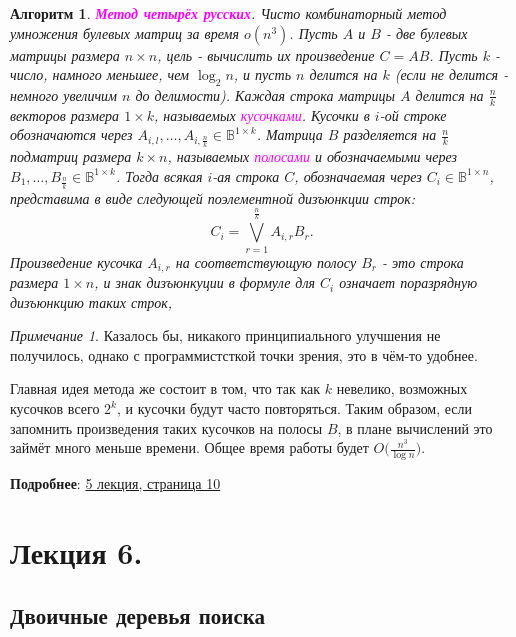 \documentclass[a4paper]{article}
\theoremstyle{indented}
\newtheorem{alg}{Алгоритм}
\theoremstyle{definition}
\theoremstyle{remark}
\newtheorem{remark}{Примечание}
\begin{document}
\begin{alg}
    \textcolor{magenta}{\hypertarget{t26}{\textbf{Метод четырёх русских}}}. Чисто комбинаторный метод умножения булевых матриц за время $o(n^3)$. Пусть $A$ и $B$ - две булевых матрицы размера $n\times n$, цель - вычислить их произведение $C=AB$. Пусть $k$ - число, намного меньшее, чем $\log_2 n$, и пусть $n$ делится на $k$ (если не делится - немного увеличим $n$ до делимости). Каждая строка матрицы $A$ делится на $\frac{n}{k}$ векторов размера $1\times k$, называемых \textcolor{magenta}{\hypertarget{d11}{\textit{кусочками}}}. Кусочки в $i$-ой строке обозначаются через $A_{i, l}, \ldots, A_{i, \frac{n}{k}}\in \mathbb{B}^{1\times k}$. Матрица $B$ разделяется на $\frac{n}{k}$ подматриц размера $k\times n$, называемых \textcolor{magenta}{\hypertarget{d12}{\textit{полосами}}} и обозначаемыми через $B_1, \ldots, B_{\frac{n}{k}}\in \mathbb{B}^{1\times k}$. Тогда всякая $i$-ая строка $C$, обозначаемая через $C_i\in \mathbb{B}^{1\times n}$, представима в виде следующей поэлементной дизъюнкции строк:
    \[
        C_i=\bigvee_{r=1}^{\frac{n}{k}}A_{i, r}B_r. 
    \]
    Произведение кусочка $A_{i, r}$ на соответствующую полосу $B_r$ - это строка размера $1\times n$, и знак дизъюнкуции в формуле для $C_i$ означает поразрядную дизъюнкцию таких строк,
\end{alg}

\begin{remark}
    Казалось бы, никакого принципиального улучшения не получилось, однако с программистсткой точки зрения, это в чём-то удобнее. \ 

    Главная идея метода же состоит в том, что так как $k$ невелико, возможных кусочков всего $2^k$, и кусочки будут часто повторяться. Таким образом, если запомнить произведения таких кусочков на полосы $B$, в плане вычислений это займёт много меньше времени. Общее время работы будет $O\biggl(\frac{n^3}{\log n}\biggr)$. 
\end{remark}

\textbf{Подробнее}: \href{https://users.math-cs.spbu.ru/~okhotin/teaching/algorithms_2020/okhotin_algorithms_2020_l5.pdf}{5 лекция, страница 10}

\section{Лекция 6.}

\subsection{Двоичные деревья поиска}
\end{document}
